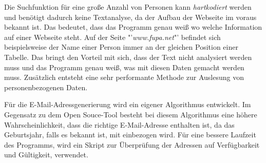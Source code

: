 Die Suchfunktion für eine große Anzahl von Personen kann \textit{hartkodiert} werden und benötigt dadurch keine Textanalyse, da der Aufbau der Webseite im voraus bekannt ist. Das bedeutet, dass das Programm genau weiß wo welche Information auf einer Webseite steht. Auf der Seite "'\textit{www.fupa.net}"' befindet sich beispielsweise der Name einer Person immer an der gleichen Position einer Tabelle. Das bringt den Vorteil mit sich, dass der Text nicht analysiert werden muss und das Programm genau weiß, was mit diesen Daten gemacht werden muss. Zusätzlich entsteht eine sehr performante Methode zur Auslesung von personenbezogenen Daten.

Für die E-Mail-Adressgenerierung wird ein eigener Algorithmus entwickelt. Im Gegensatz zu dem Open Souce-Tool \cite{Bazzell} besteht bei diesem Algorithmus eine höhere Wahrscheinlichkeit, dass die richtige E-Mail-Adresse enthalten ist, da das Geburtsjahr, falls es bekannt ist, mit einbezogen wird. Für eine bessere Laufzeit des Programms, wird ein Skript zur Überprüfung der Adressen auf Verfügbarkeit und Gültigkeit, verwendet.
